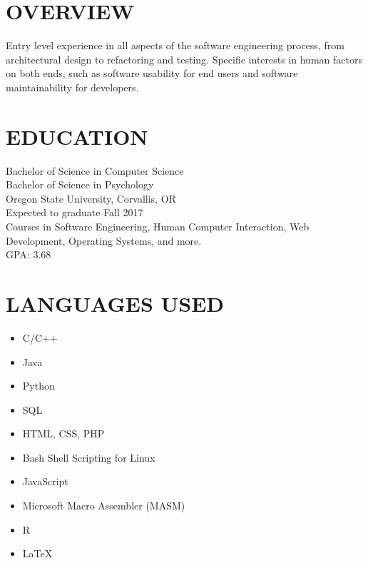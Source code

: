 \documentclass[line, margin]{res}
\begin{document}
\address{636 NW 10th St\\ Corvallis, OR 97330\\ (541) 740-6700\\ hoffera@oregonstate.edu}

\begin{resume}
\section{OVERVIEW}
Entry level experience in all aspects of the software engineering process, from architectural design to refactoring and testing. Specific interests in human factors on both ends, such as software usability for end users and software maintainability for developers.

\section{EDUCATION}
Bachelor of Science in Computer Science \\
Bachelor of Science in Psychology \\
Oregon State University, Corvallis, OR \\
Expected to graduate Fall 2017 \\
Courses in Software Engineering, Human Computer Interaction, Web Development, Operating Systems, and more. \\
GPA: 3.68

\section{LANGUAGES USED}
\begin{itemize}
\small
\item C/C++
\item Java
\item Python
\item SQL
\item HTML, CSS, PHP
\item Bash Shell Scripting for Linux
\item JavaScript
\item Microsoft Macro Assembler (MASM)
\item R
\item LaTeX
\end{itemize}


\end{resume}
\end{document}
